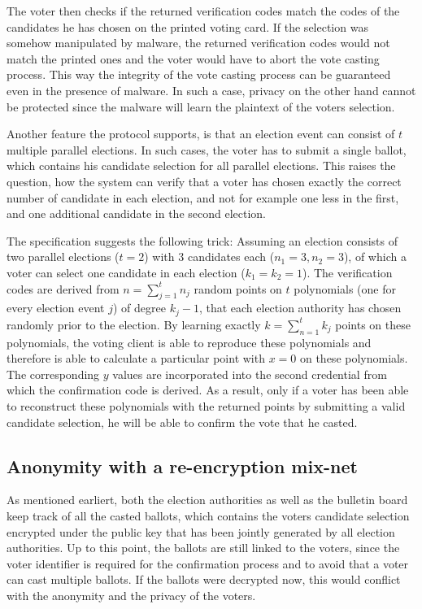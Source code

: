 The voter then checks if the returned verification codes match the codes of the candidates he has chosen on the printed voting card. If the selection was somehow manipulated by malware, the returned verification codes would not match the printed ones and the voter would have to abort the vote casting process. This way the integrity of the vote casting process can be guaranteed even in the presence of malware. In such a case, privacy on the other hand cannot be protected since the malware will learn the plaintext of the voters selection.

Another feature the protocol supports, is that an election event can consist of $t$ multiple parallel elections. In such cases, the voter has to submit a single ballot, which contains his candidate selection for all parallel elections. This raises the question, how the system can verify that a voter has chosen exactly the correct number of candidate in each election, and not for example one less in the first, and one additional candidate in the second election.

The specification suggests the following trick: Assuming an election consists of two parallel elections ($t=2$) with 3 candidates each ($n_1 = 3, n_2 = 3$), of which a voter can select one candidate in each election ($k_1 = k_2 =1$). The verification codes are derived from $n = \sum_{j=1}^{t} n_j$ random points on $t$ polynomials (one for every election event $j$) of degree $k_j - 1$, that each election authority has chosen randomly prior to the election. By learning exactly $k = \sum_{n=1}^{t} k_j$ points on these polynomials, the voting client is able to reproduce these polynomials and therefore is able to calculate a particular point with $x=0$ on these polynomials. The corresponding $y$ values are incorporated into the second credential from which the confirmation code is derived. As a result, only if a voter has been able to reconstruct these polynomials with the returned points by submitting a valid candidate selection, he will be able to confirm the vote that he casted.

\subsection{Anonymity with a re-encryption mix-net}

As mentioned earliert, both the election authorities as well as the bulletin board keep track of all the casted ballots, which contains the voters candidate selection encrypted under the public key that has been jointly generated by all election authorities. Up to this point, the ballots are still linked to the voters, since the voter identifier is required for the confirmation process and to avoid that a voter can cast multiple ballots. If the ballots were decrypted now, this would conflict with the anonymity and the privacy of the voters.

